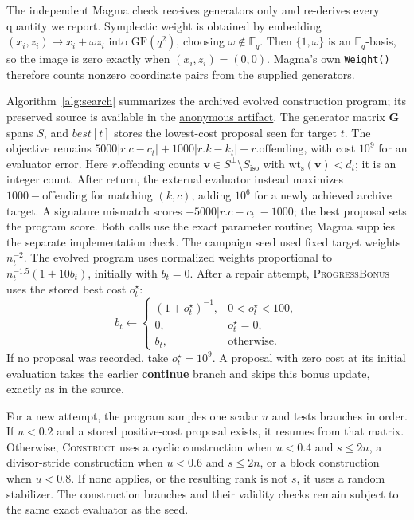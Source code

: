 \documentclass{article}
\newcommand{\F}{\mathbb{F}}
\newcommand{\artifactlink}{\href{https://anonymous.4open.science/r/llm_guided_EAQECC_search-4099}{anonymous artifact}}
\newcommand{\vct}[1]{\boldsymbol{#1}} %
\newcommand{\wt}{\operatorname{wt_s}}
\begin{document}
The independent Magma check receives generators only and re-derives every quantity we
report. Symplectic weight is obtained by embedding
$(x_i,z_i)\mapsto x_i+\omega z_i$ into $\mathrm{GF}(q^2)$, choosing
$\omega\notin\F_q$. Then $\{1,\omega\}$ is an $\F_q$-basis, so the image
is zero exactly when $(x_i,z_i)=(0,0)$. Magma's own \texttt{Weight()}
therefore counts nonzero coordinate pairs from the supplied generators.

Algorithm~\ref{alg:search} summarizes the archived evolved construction
program; its preserved source is available in the
\artifactlink{}.\label{app:construction-program}
The generator matrix $\mathbf{G}$ spans $S$, and $best[t]$ stores the
lowest-cost proposal seen for target $t$. The objective remains
$5000|r.c-c_t|+1000|r.k-k_t|+r.\mathrm{offending}$, with cost $10^9$
for an evaluator error. Here $r.\mathrm{offending}$ counts
$\vct v\in S^\perp\setminus S_{\mathrm{iso}}$ with $\wt(\vct v)<d_t$;
it is an integer count. After return, the external evaluator instead
maximizes $1000-\mathrm{offending}$ for matching $(k,c)$, adding $10^6$
for a newly achieved archive target. A signature mismatch scores
$-5000|r.c-c_t|-1000$; the best proposal sets the program score.
Both calls use the exact parameter routine; Magma supplies the separate
implementation check.
The campaign seed used fixed target weights
$n_t^{-2}$. The evolved program uses normalized weights proportional to
$n_t^{-1.5}(1+10b_t)$, initially with $b_t=0$. After a repair attempt,
\textsc{ProgressBonus} uses the stored best cost $o_t^\star$:
\[
 b_t\gets
 \begin{cases}
  (1+o_t^\star)^{-1},&0<o_t^\star<100,\\
  0,&o_t^\star=0,\\
  b_t,&\text{otherwise}.
 \end{cases}
\]
If no proposal was recorded, take $o_t^\star=10^9$. A proposal with
zero cost at its initial evaluation takes the earlier \textbf{continue}
branch and skips this bonus update, exactly as in the source.

For a new attempt, the program samples one scalar $u$ and tests branches
in order. If $u<0.2$ and a stored positive-cost proposal exists, it resumes
from that matrix. Otherwise, \textsc{Construct} uses a cyclic construction
when $u<0.4$ and $s\le2n$, a divisor-stride construction when $u<0.6$
and $s\le2n$, or a block construction when $u<0.8$. If none applies,
or the resulting rank is not $s$, it uses a random stabilizer.
The construction branches and their validity checks remain subject to the
same exact evaluator as the seed.
\end{document}
